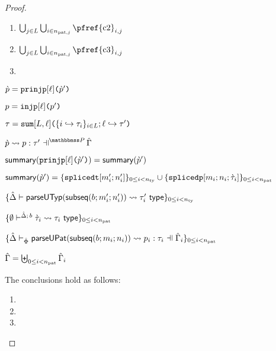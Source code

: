 \begin{grayparbox}
\begin{proof}
\begin{byCases}
\begin{enumerate}
      \item $\bigcup_{j \in \labelset} \bigcup_{i \in \npatj} \text{\pfref{c2}}_{i,j}$
      \item $\bigcup_{j \in \labelset} \bigcup_{i \in \npatj} \text{\pfref{c3}}_{i,j}$
      \item {}
    \end{enumerate}
    \resetpfcounter
  \item[\text{(\ref{rule:cvalidP-UP-in})}]
    \begin{pfsteps*}
      \item $\grave{p}=\texttt{prinjp}[\ell]\texttt{(}\grave{p}'\texttt{)}$ 
      \item $p=\texttt{injp}[\ell]\texttt{(}p'\texttt{)}$ 
      \item $\tau=\texttt{sum}[L, \ell]\texttt{(}\{i \hookrightarrow \tau_{i}\}_{i \in L}; \ell \hookrightarrow \tau'\texttt{)}$ 
      \item $\cvalidP{\upctx}{\pscenev}{\cpv}{p}{\tau'}$  
      \item $\mathsf{summary}(\texttt{prinjp}[\ell]\texttt{(}\grave{p}'\texttt{)}) = \mathsf{summary}(\grave{p}')$  
      \item $\mathsf{summary}(\grave{p}') = \{\texttt{splicedt}[m'_i; n'_i]\}_{0 \leq i < n_\text{ty}} \cup \{\texttt{splicedp}[m_i; n_i; \grave{\tau}_i]\}_{0 \leq i < n_\text{pat}}$  
      \item $\{
            \hat{\Delta} \vdash 
              \mathsf{parseUTyp}(\mathsf{subseq}(b; m'_i; n'_i))
             \leadsto \tau'_i~\mathsf{type}
          \}_{0 \leq i < n_\text{ty}}$  
      \item $\{
        \emptyset\vdash^{
          \hat{\Delta};\,b
        } 
          \grave{\tau}_i
         \leadsto \tau_i~\mathsf{type}
      \}_{0 \leq i < n_\text{pat}}$  
      \item $\sseq{
        \patExpands
          {\upctx_i}
          {\uPhi}
          {\parseUPatF{\bsubseq{b}{m_i}{n_i}}}
          {p_i}
          {\tau_i}
      }{\npat}$  
    \item $\hat\Gamma = \biguplus_{0 \leq i < n_\text{pat}} \hat\Gamma_i$ \end{pfsteps*}
    The conclusions hold as follows:
    \begin{enumerate}
    \item {}
    \item {}
    \item {}

\end{enumerate}
\end{byCases}
\end{proof}
\end{grayparbox}
